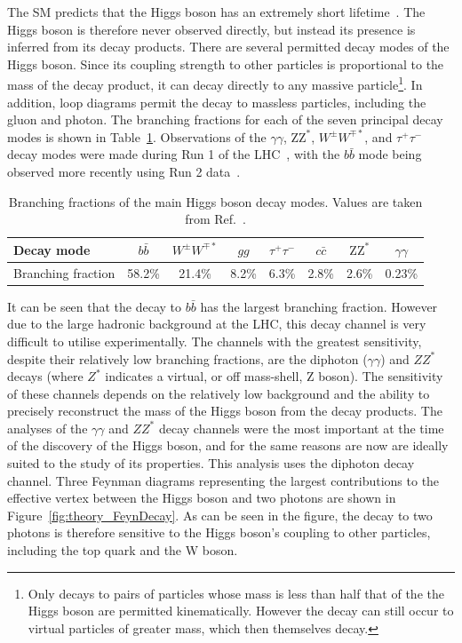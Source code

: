 The SM predicts that the Higgs boson has an extremely short lifetime~\cite{YR4}.
The Higgs boson is therefore never observed directly, 
but instead its presence is inferred from its decay products.
There are several permitted decay modes of the Higgs boson.
Since its coupling strength to other particles is proportional to the mass of the decay product, 
it can decay directly to any massive particle\footnote{Only decays to pairs of particles 
whose mass is less than half that of the the Higgs boson are permitted kinematically. 
However the decay can still occur to virtual particles of greater mass, which then themselves decay.}.
In addition, loop diagrams permit the decay to massless particles, including the gluon and photon.
The branching fractions for each of the seven principal decay modes 
is shown in Table~\ref{tab:theory_decay}.
Observations of the $\gamma\gamma$, $\mathrm{ZZ}^{*}$, $W^{\pm}W^{\mp*}$, 
and $\tau^+\tau^-$ decay modes were made during Run 1 
of the LHC~\cite{ATLAScouplingsRun1,CMScouplingsRun1,ATLASandCMScouplingsRun1}, 
with the $b\bar{b}$ mode being observed more recently 
using Run 2 data~\cite{ATLAStautauObservation,CMStautauObservation,ATLASbbObservation,CMSbbObservation}.

\begin{table}
  \centering
  \begin{tabular}{ l | c c c c c c c }
      \hline
      Decay mode & $b\bar{b}$ & $W^{\pm}W^{\mp*}$ & $gg$ & $\tau^+\tau^-$ & $c\bar{c}$ & $\mathrm{ZZ}^{*}$ & $\gamma\gamma$ \\
      \hline
      Branching fraction & 58.2\% & 21.4\% & 8.2\% & 6.3\% & 2.8\% & 2.6\% & 0.23\% \\
      \hline
  \end{tabular}%
  \caption[Branching fractions of the main Higgs boson decay modes.]
  {
    Branching fractions of the main Higgs boson decay modes. 
    Values are taken from Ref.~\cite{YR4}.
  }
  \label{tab:theory_decay}
\end{table}

It can be seen that the decay to $b\bar{b}$ has the largest branching fraction.
However due to the large hadronic background at the LHC, 
this decay channel is very difficult to utilise experimentally.
The channels with the greatest sensitivity, despite their relatively low branching fractions, 
are the diphoton ($\gamma\gamma$) and $ZZ^{*}$ decays 
(where $Z^{*}$ indicates a virtual, or off mass-shell, Z boson).
The sensitivity of these channels depends on the relatively low background 
and the ability to precisely reconstruct the mass of the Higgs boson from the decay products.
The analyses of the $\gamma\gamma$ and $ZZ^{*}$ decay channels were the most important 
at the time of the discovery of the Higgs boson, 
and for the same reasons are now are ideally suited to the study of its properties.
This analysis uses the diphoton decay channel.
Three Feynman diagrams representing the largest contributions to the effective vertex 
between the Higgs boson and two photons are shown in Figure~\ref{fig:theory_FeynDecay}.
As can be seen in the figure, 
the decay to two photons is therefore sensitive to the Higgs boson's coupling to other particles, 
including the top quark and the W boson.


